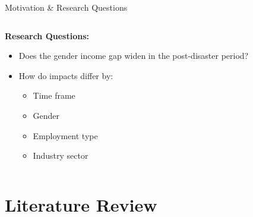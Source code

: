 \documentclass[serif, aspectratio=169]{beamer}
\begin{document}
\begin{frame}{Motivation \& Research Questions}
\begin{columns}[T]
        \begin{column}{0.5\textwidth}
            \textbf{Research Questions:}
            \begin{itemize}\small
                \item Does the gender income gap widen in the post-disaster period?
                \item How do impacts differ by:
                    \begin{itemize}\footnotesize
                        \item Time frame
                        \item Gender
                        \item Employment type
                        \item Industry sector
                    \end{itemize}
            \end{itemize}
        \end{column}
    \end{columns}
\end{frame}

\section{Literature Review}
\end{document}
